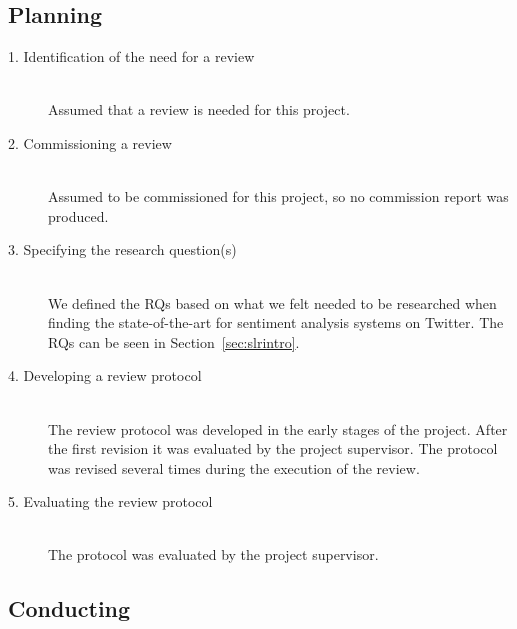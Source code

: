 \subsection{Planning}

\begin{description}

	\item[1. Identification of the need for a review] \hfill \\
		Assumed that a review is needed for this project. 
		
	\item[2. Commissioning a review] \hfill \\
		Assumed to be commissioned for this project, so no commission report was produced. 

	\item[3. Specifying the research question(s)] \hfill \\
		We defined the RQs based on what we felt needed to be researched when finding the state-of-the-art for sentiment analysis systems on Twitter. The RQs can be seen in Section~\ref{sec:slrintro}. 

	\item[4. Developing a review protocol] \hfill \\
		The review protocol  was developed in the early stages of the project. After the first revision it was evaluated by the project supervisor. The protocol was revised several times during the execution of the review.
	

	\item[5. Evaluating the review protocol] \hfill \\
		The protocol was evaluated by the project supervisor. 

\end{description}


\subsection{Conducting}

